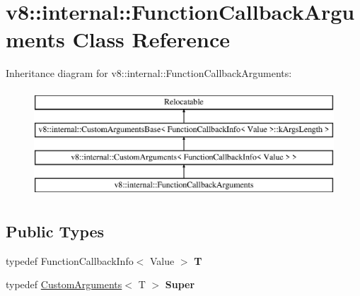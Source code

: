 \hypertarget{classv8_1_1internal_1_1_function_callback_arguments}{}\section{v8\+:\+:internal\+:\+:Function\+Callback\+Arguments Class Reference}
\label{classv8_1_1internal_1_1_function_callback_arguments}
Inheritance diagram for v8\+:\+:internal\+:\+:Function\+Callback\+Arguments\+:\begin{figure}[H]
\begin{center}
\leavevmode
\includegraphics[height=4.000000cm]{classv8_1_1internal_1_1_function_callback_arguments}
\end{center}
\end{figure}
\subsection*{Public Types}
\begin{DoxyCompactItemize}
\item 
\hypertarget{classv8_1_1internal_1_1_function_callback_arguments_a890c9aefecb1702b70b70b2f8dd9aa48}{}typedef Function\+Callback\+Info$<$ Value $>$ {\bfseries T}\label{classv8_1_1internal_1_1_function_callback_arguments_a890c9aefecb1702b70b70b2f8dd9aa48}

\item 
\hypertarget{classv8_1_1internal_1_1_function_callback_arguments_a9f38caba6a1d9692f7244e8f69f72a11}{}typedef \hyperlink{classv8_1_1internal_1_1_custom_arguments}{Custom\+Arguments}$<$ T $>$ {\bfseries Super}\label{classv8_1_1internal_1_1_function_callback_arguments_a9f38caba6a1d9692f7244e8f69f72a11}

\end{DoxyCompactItemize}
